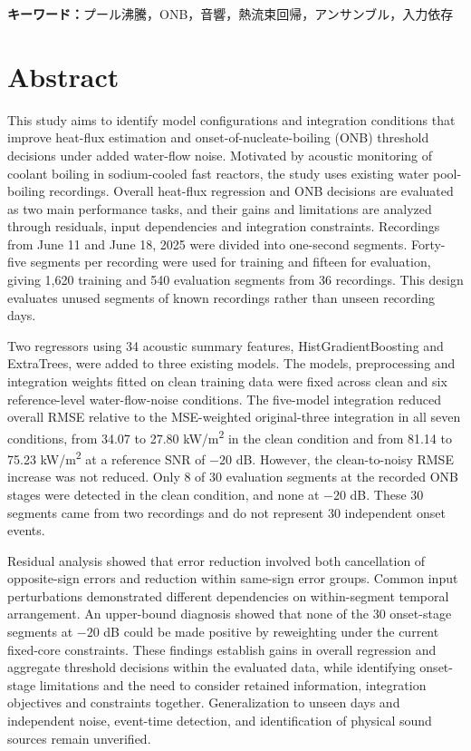 \noindent\textbf{キーワード：}プール沸騰，ONB，音響，熱流束回帰，アンサンブル，入力依存

\chapter*{Abstract}
This study aims to identify model configurations and integration conditions that improve heat-flux estimation and onset-of-nucleate-boiling (ONB) threshold decisions under added water-flow noise. Motivated by acoustic monitoring of coolant boiling in sodium-cooled fast reactors, the study uses existing water pool-boiling recordings. Overall heat-flux regression and ONB decisions are evaluated as two main performance tasks, and their gains and limitations are analyzed through residuals, input dependencies and integration constraints. Recordings from June 11 and June 18, 2025 were divided into one-second segments. Forty-five segments per recording were used for training and fifteen for evaluation, giving 1,620 training and 540 evaluation segments from 36 recordings. This design evaluates unused segments of known recordings rather than unseen recording days.

Two regressors using 34 acoustic summary features, HistGradientBoosting and ExtraTrees, were added to three existing models. The models, preprocessing and integration weights fitted on clean training data were fixed across clean and six reference-level water-flow-noise conditions. The five-model integration reduced overall RMSE relative to the MSE-weighted original-three integration in all seven conditions, from 34.07 to 27.80 kW/m\textsuperscript{2} in the clean condition and from 81.14 to 75.23 kW/m\textsuperscript{2} at a reference SNR of $-20$ dB. However, the clean-to-noisy RMSE increase was not reduced. Only 8 of 30 evaluation segments at the recorded ONB stages were detected in the clean condition, and none at $-20$ dB. These 30 segments came from two recordings and do not represent 30 independent onset events.

Residual analysis showed that error reduction involved both cancellation of opposite-sign errors and reduction within same-sign error groups. Common input perturbations demonstrated different dependencies on within-segment temporal arrangement. An upper-bound diagnosis showed that none of the 30 onset-stage segments at $-20$ dB could be made positive by reweighting under the current fixed-core constraints. These findings establish gains in overall regression and aggregate threshold decisions within the evaluated data, while identifying onset-stage limitations and the need to consider retained information, integration objectives and constraints together. Generalization to unseen days and independent noise, event-time detection, and identification of physical sound sources remain unverified.
